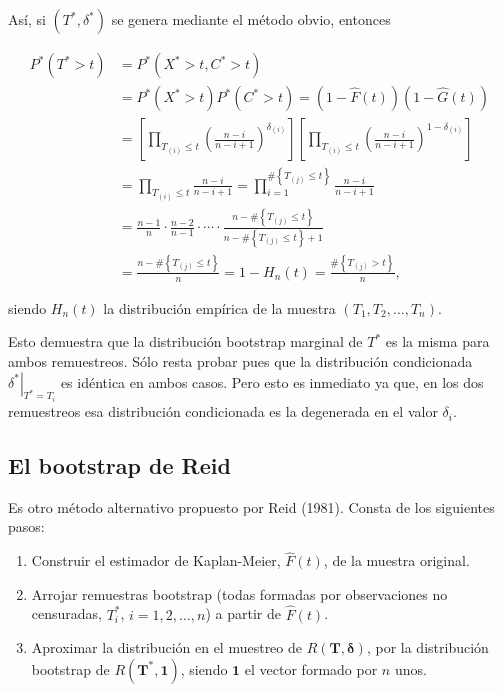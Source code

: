 \documentclass[]{book}
\theoremstyle{definition}
\theoremstyle{definition}
\theoremstyle{definition}
\theoremstyle{remark}
\begin{document}
Así, si \(\left( T^{\ast},\delta^{\ast} \right)\) se genera mediante el
método obvio, entonces

\[\begin{aligned}
P^{\ast}\left( T^{\ast}>t \right) &= P^{\ast}\left( X^{\ast}>t,C^{\ast
}>t \right) \\
&= P^{\ast}\left( X^{\ast}>t \right) P^{\ast}\left( C^{\ast}>t \right)
=\left( 1-\hat{F}\left( t \right) \right) \left( 1-\hat{G}\left( t \right)
 \right) \\
&= \left[ \prod_{T_{(i)}\leq t}\left( \frac{n-i}{n-i+1} \right)
^{\delta _{(i)}}\right] \left[ \prod_{T_{(i)}\leq
t}\left( \frac{n-i}{n-i+1} \right)^{1-\delta _{(i)}}\right] \\
&= \prod_{T_{(i)}\leq t}\frac{n-i}{n-i+1}=\prod_{i=1}^{\#\left
\{ T_{(j)}\leq t\right\} }\frac{n-i}{n-i+1} \\
&= \frac{n-1}{n}\cdot \frac{n-2}{n-1}\cdot \cdots \cdot \frac{n-\#\left\{
T_{(j)}\leq t\right\} }{n-\#\left\{ T_{(j)}\leq
t\right\} +1} \\
&= \frac{n-\#\left\{ T_{(j)}\leq t\right\} }{n}=1-H_n\left(
t \right) =\frac{\#\left\{ T_{(j)}>t\right\} }{n},
\end{aligned}\]

siendo \(H_n\left( t \right)\) la distribución empírica de la muestra
\(\left( T_1,T_2,\ldots ,T_n \right)\).

Esto demuestra que la distribución bootstrap marginal de \(T^{\ast}\) es
la misma para ambos remuestreos. Sólo resta probar pues que la
distribución condicionada
\(\left. \delta^{\ast}\right\vert _{T^{\ast}=T_i}\) es idéntica en ambos
casos. Pero esto es inmediato ya que, en los dos remuestreos esa
distribución condicionada es la degenerada en el valor \(\delta _i\).

\subsection{El bootstrap de Reid}\label{cap8-reid}

Es otro método alternativo propuesto por Reid (1981). Consta de los
siguientes pasos:

\begin{enumerate}
\def\labelenumi{\arabic{enumi}.}
\item
  Construir el estimador de Kaplan-Meier, \(\hat{F}\left( t \right)\),
  de la muestra original.
\item
  Arrojar remuestras bootstrap (todas formadas por observaciones no
  censuradas, \(T_i^{\ast}\), \(i=1,2,\ldots ,n\)) a partir de
  \(\hat{F}\left(t \right)\).
\item
  Aproximar la distribución en el muestreo de
  \(R\left( \mathbf{T},\boldsymbol{\delta} \right)\), por la
  distribución bootstrap de
  \(R\left( \mathbf{T}^{\ast},\mathbf{1} \right)\), siendo
  \(\mathbf{1}\) el vector formado por \(n\) unos.
\end{enumerate}
\end{document}
